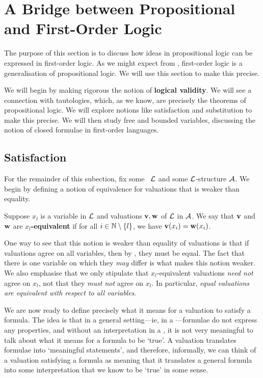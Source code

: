 \section{A Bridge between Propositional and First-Order Logic}

The purpose of this section is to discuss how ideas in propositional logic can be expressed in first-order logic. As we might expect from , first-order logic is a generalisation of propositional logic. We will use this section to make this precise.

We will begin by making rigorous the notion of \textbf{logical validity}. We will see a connection with tautologies, which, as we know, are precisely the theorems of propositional logic. We will explore notions like satisfaction and substitution to make this precise. We will then study free and bounded variables, discussing the notion of closed formulae in first-order languages.

\subsection{Satisfaction}

For the remainder of this subection, fix some \fola\ $\mathcal{L}$ and some $\mathcal{L}$-structure $\mathcal{A}$. We begin by defining a notion of equivalence for valuations that is weaker than equality.

\begin{boxdefinition}
    Suppose $x_l$ is a variable in $\mathcal{L}$ and valuations $\mathbf{v}, \mathbf{w}$ of $\mathcal{L}$ in $\mathcal{A}$. We say that $\mathbf{v}$ and $\mathbf{w}$ are \textbf{$x_l$-equivalent} if for all $i \in \mathbb{N} \setminus \left\{ l \right\}$, we have $\mathbf{v}\!\left( x_i \right) = \mathbf{w}\!\left( x_i \right)$.
\end{boxdefinition}

One way to see that this notion is weaker than equality of valuations is that if valuations agree on all variables, then by , they must be equal. The fact that there is one variable on which they \textit{may} differ is what makes this notion weaker. We also emphasise that we only stipulate that $x_l$-equivalent valuations \textit{need not} agree on $x_l$, not that they \textit{must not} agree on $x_l$. In particular, \textit{equal valuations are equivalent with respect to all variables}.

We are now ready to define precisely what it means for a valuation to satisfy a formula. The idea is that in a general setting---ie, in a \fola---formulae do not express any properties, and without an interpretation in a \fos, it is not very meaningful to talk about what it means for a formula to be `true'. A valuation translates formulae into `meaningful statements', and therefore, informally, we can think of a valuation satisfying a formula as meaning that it translates a general formula into some interpretation that we know to be `true' in some sense.

